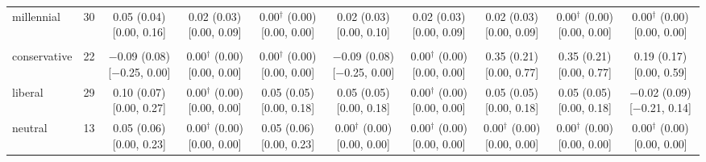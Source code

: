 \begin{table}[t]
\begin{tabular}{@{}lr*{8}{c}@{}}
\quad millennial & 30 & \makecell{0.05 (0.04)\\ {[}0.00, 0.16{]}} & \makecell{0.02 (0.03)\\ {[}0.00, 0.09{]}} & \makecell{0.00$^\dagger$ (0.00)\\ {[}0.00, 0.00{]}} & \makecell{0.02 (0.03)\\ {[}0.00, 0.10{]}} & \makecell{0.02 (0.03)\\ {[}0.00, 0.09{]}} & \makecell{0.02 (0.03)\\ {[}0.00, 0.09{]}} & \makecell{0.00$^\dagger$ (0.00)\\ {[}0.00, 0.00{]}} & \makecell{0.00$^\dagger$ (0.00)\\ {[}0.00, 0.00{]}} \\
\addlinespace
\multicolumn{10}{@{}l}{\textit{Ideology (N)}} \\
\quad conservative & 22 & \makecell{$-$0.09 (0.08)\\ {[}$-$0.25, 0.00{]}} & \makecell{0.00$^\dagger$ (0.00)\\ {[}0.00, 0.00{]}} & \makecell{0.00$^\dagger$ (0.00)\\ {[}0.00, 0.00{]}} & \makecell{$-$0.09 (0.08)\\ {[}$-$0.25, 0.00{]}} & \makecell{0.00$^\dagger$ (0.00)\\ {[}0.00, 0.00{]}} & \makecell{0.35 (0.21)\\ {[}0.00, 0.77{]}} & \makecell{0.35 (0.21)\\ {[}0.00, 0.77{]}} & \makecell{0.19 (0.17)\\ {[}0.00, 0.59{]}} \\
\quad liberal & 29 & \makecell{0.10 (0.07)\\ {[}0.00, 0.27{]}} & \makecell{0.00$^\dagger$ (0.00)\\ {[}0.00, 0.00{]}} & \makecell{0.05 (0.05)\\ {[}0.00, 0.18{]}} & \makecell{0.05 (0.05)\\ {[}0.00, 0.18{]}} & \makecell{0.00$^\dagger$ (0.00)\\ {[}0.00, 0.00{]}} & \makecell{0.05 (0.05)\\ {[}0.00, 0.18{]}} & \makecell{0.05 (0.05)\\ {[}0.00, 0.18{]}} & \makecell{$-$0.02 (0.09)\\ {[}$-$0.21, 0.14{]}} \\
\quad neutral & 13 & \makecell{0.05 (0.06)\\ {[}0.00, 0.23{]}} & \makecell{0.00$^\dagger$ (0.00)\\ {[}0.00, 0.00{]}} & \makecell{0.05 (0.06)\\ {[}0.00, 0.23{]}} & \makecell{0.00$^\dagger$ (0.00)\\ {[}0.00, 0.00{]}} & \makecell{0.00$^\dagger$ (0.00)\\ {[}0.00, 0.00{]}} & \makecell{0.00$^\dagger$ (0.00)\\ {[}0.00, 0.00{]}} & \makecell{0.00$^\dagger$ (0.00)\\ {[}0.00, 0.00{]}} & \makecell{0.00$^\dagger$ (0.00)\\ {[}0.00, 0.00{]}} \\

\end{tabular}
\end{table}
